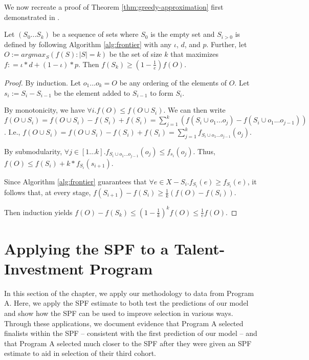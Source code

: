 We now recreate a proof of Theorem \ref{thm:greedy-approximation} first demonstrated in \cite{nemhauser1978analysis}.

\begin{theorem}\label{thm:greedy-approximation}
    Let $(S_0...S_k)$ be a sequence of sets where $S_0$ is the empty set and $S_{i>0}$ is defined by following Algorithm \ref{alg:frontier} with any $\iota$, $d$, and $p$. Further, let $O := argmax_S(f(S) : |S| = k)$ be the set of size $k$ that maximizes $f: = \iota*d+(1-\iota)*p$. Then $f(S_k) \geq (1 - \frac{1}{e})f(O)$.
\end{theorem}

\begin{proof}
By induction. Let ${o_1...o_k} = O$ be any ordering of the elements of $O$. Let ${s_i} := S_i - S_{i-1}$ be the element added to $S_{i-1}$ to form $S_i$.

By monotonicity, we have $\forall i . f(O) \leq f(O \cup S_i)$.  We can then write $f(O \cup S_i) = f(O \cup S_i) - f(S_i) + f(S_i) = \sum_{j=1}^{k} (f(S_i \cup {o_1...o_j}) - f(S_i \cup {o_1...o_{j-1}}))$. I.e., $f(O \cup S_i) = f(O \cup S_i) - f(S_i) + f(S_i) = \sum_{j=1}^{k} f_{S_i \cup {o_1...o_{j-1}}}(o_j)$.

By submodularity, $\forall j \in [1...k] . f_{S_i \cup {o_1...o_{j-1}}}(o_j) \leq f_{s_i}(o_j)$. Thus, $f(O) \leq f(S_i) + k*f_{S_i}(s_{i+1})$. 

Since Algorithm \ref{alg:frontier} guarantees that $\forall e \in X - S_i . f_{S_i}(e) \geq f_{S_i}(e)$, it follows that, at every stage, $f(S_{i+1}) - f(S_i) \geq \frac{1}{k} (f(O) - f(S_i))$.

Then induction yields $f(O) - f(S_k) \leq (1 - \frac{1}{k})^k f(O) \leq \frac{1}{e} f(O)$.
\end{proof}

\section{Applying the SPF to a Talent-Investment Program}\label{sec:spfcase}

In this section of the chapter, we apply our methodology to data from Program A. Here, we apply the SPF estimate to both test the predictions of our model and show how the SPF can be used to improve selection in various ways. Through these applications, we document evidence that Program A selected finalists within the SPF -- consistent with the first prediction of our model -- and that Program A selected much closer to the SPF after they were given an SPF estimate to aid in selection of their third cohort.

